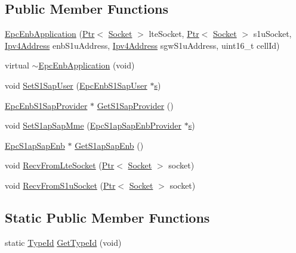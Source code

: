 \subsection*{Public Member Functions}
\begin{DoxyCompactItemize}
\item 
\hyperlink{classns3_1_1EpcEnbApplication_af36198bbc50d4acfb104fe448c25a041}{Epc\+Enb\+Application} (\hyperlink{classns3_1_1Ptr}{Ptr}$<$ \hyperlink{classns3_1_1Socket}{Socket} $>$ lte\+Socket, \hyperlink{classns3_1_1Ptr}{Ptr}$<$ \hyperlink{classns3_1_1Socket}{Socket} $>$ s1u\+Socket, \hyperlink{classns3_1_1Ipv4Address}{Ipv4\+Address} enb\+S1u\+Address, \hyperlink{classns3_1_1Ipv4Address}{Ipv4\+Address} sgw\+S1u\+Address, uint16\+\_\+t cell\+Id)
\item 
virtual \hyperlink{classns3_1_1EpcEnbApplication_a1832c20d47399a14e178631b371ace7f}{$\sim$\+Epc\+Enb\+Application} (void)
\item 
void \hyperlink{classns3_1_1EpcEnbApplication_aec298b6adc29bad4c52828ddf1a260d6}{Set\+S1\+Sap\+User} (\hyperlink{classns3_1_1EpcEnbS1SapUser}{Epc\+Enb\+S1\+Sap\+User} $\ast$\hyperlink{generate__test__data__lte__sinr_8m_ad83eeb3a142285d1243a08c6b7026df8}{s})
\item 
\hyperlink{classns3_1_1EpcEnbS1SapProvider}{Epc\+Enb\+S1\+Sap\+Provider} $\ast$ \hyperlink{classns3_1_1EpcEnbApplication_a706b531d6ec3ab6eb37567232f5c6cd4}{Get\+S1\+Sap\+Provider} ()
\item 
void \hyperlink{classns3_1_1EpcEnbApplication_aa0abdd37248e00380c250e01ff12a841}{Set\+S1ap\+Sap\+Mme} (\hyperlink{classns3_1_1EpcS1apSapEnbProvider}{Epc\+S1ap\+Sap\+Enb\+Provider} $\ast$\hyperlink{generate__test__data__lte__sinr_8m_ad83eeb3a142285d1243a08c6b7026df8}{s})
\item 
\hyperlink{classns3_1_1EpcS1apSapEnb}{Epc\+S1ap\+Sap\+Enb} $\ast$ \hyperlink{classns3_1_1EpcEnbApplication_a8790ba0ca5cc4bb0a7965a295ec12d2f}{Get\+S1ap\+Sap\+Enb} ()
\item 
void \hyperlink{classns3_1_1EpcEnbApplication_a1fea9a1b3a11d78ef1f5376ef4fcd48a}{Recv\+From\+Lte\+Socket} (\hyperlink{classns3_1_1Ptr}{Ptr}$<$ \hyperlink{classns3_1_1Socket}{Socket} $>$ socket)
\item 
void \hyperlink{classns3_1_1EpcEnbApplication_a924ee9f091bc38a41b0f421091fb1672}{Recv\+From\+S1u\+Socket} (\hyperlink{classns3_1_1Ptr}{Ptr}$<$ \hyperlink{classns3_1_1Socket}{Socket} $>$ socket)
\end{DoxyCompactItemize}
\subsection*{Static Public Member Functions}
\begin{DoxyCompactItemize}
\item 
static \hyperlink{classns3_1_1TypeId}{Type\+Id} \hyperlink{classns3_1_1EpcEnbApplication_a6b029dc383deccc1f27ae303b8cf023c}{Get\+Type\+Id} (void)
\end{DoxyCompactItemize}
